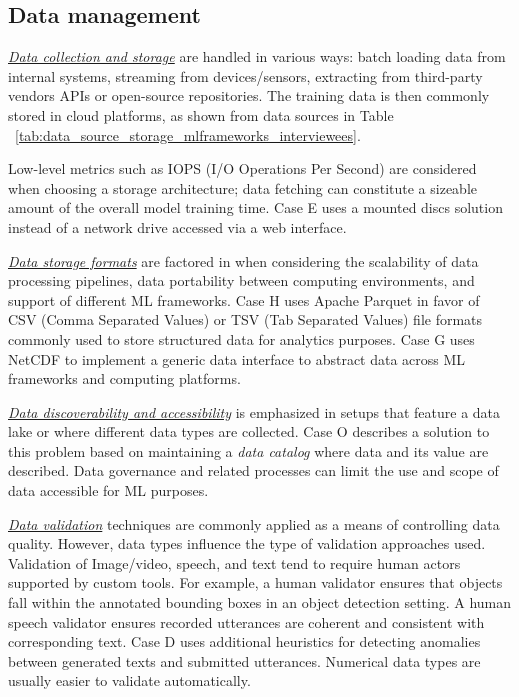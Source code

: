 \documentclass{IEEEcsmag}
\begin{document}
\begin{table*}[t]
\begin{tabular}{p{}p{}p{3cm}p{}p{2cm}p{}p{}}
   
    
    \end{tabular}\label{tab:data_source_storage_mlframeworks_interviewees}\end{table*}%

\subsection{Data management}

\underline{\emph{Data collection and storage}}
are handled in various ways: batch loading data from internal systems, streaming from devices/sensors, extracting from third-party vendors APIs or open-source repositories. The training data is then commonly stored in cloud platforms, as shown from data sources in Table ~\ref{tab:data_source_storage_mlframeworks_interviewees}.

Low-level metrics such as IOPS (I/O Operations Per Second) are considered when choosing a storage architecture; data fetching can constitute a sizeable amount of the overall model training time. Case E uses a mounted discs solution instead of a network drive accessed via a web interface. 

\underline{\emph{Data storage formats}} are factored in when considering the scalability of data processing pipelines, data portability between computing environments, and support of different ML frameworks. Case H uses Apache Parquet in favor of CSV (Comma Separated Values) or TSV (Tab Separated Values) file formats commonly used to store structured data for analytics purposes. Case G uses NetCDF to implement a generic data interface to abstract data across ML frameworks and computing platforms. 



\underline{\emph{Data discoverability and accessibility}}
is emphasized in setups that feature a data lake or where different data types are collected. Case O describes a solution to this problem based on maintaining a \textit{data catalog} where data and its value are described. Data governance and related processes can limit the use and scope of data accessible for ML purposes.


\underline{\emph{Data validation}} techniques are commonly applied as a means of controlling data quality. However, data types influence the type of validation approaches used. Validation of Image/video, speech, and text tend to require human actors supported by custom tools. For example, a human validator ensures that objects fall within the annotated bounding boxes in an object detection setting. A human speech validator ensures recorded utterances are coherent and consistent with corresponding text. Case D uses additional heuristics for detecting anomalies between generated texts and submitted utterances. Numerical data types are usually easier to validate automatically.
\end{document}
